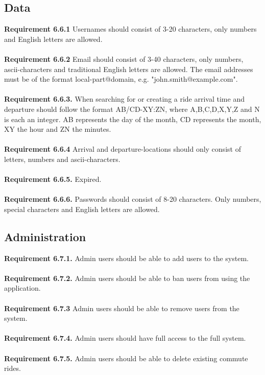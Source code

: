 \documentclass{article}
\begin{document}
\subsection{Data} \label{section:data}
\textbf{Requirement 6.6.1} Usernames should consist of 3-20 characters, only numbers and English letters are allowed. 
\mbox{}\\
\\
\textbf{Requirement 6.6.2} Email should consist of 3-40 characters, only numbers, ascii-characters and traditional English letters are allowed. The email addresses must be of the format local-part@domain, e.g. "john.smith@example.com".
\mbox{}\\
\\
\textbf{Requirement 6.6.3.} When searching for or creating a ride  arrival time and departure should follow the format AB/CD-XY:ZN, where A,B,C,D,X,Y,Z and N is each an integer. AB represents the day of the month, CD represents the month, XY the hour and ZN the minutes. 
\\ \\
\textbf{Requirement 6.6.4} Arrival and departure-locations should only consist of letters, numbers and ascii-characters.
\\ \\
\textbf{Requirement 6.6.5.} Expired.
\\ \\ 
\textbf{Requirement 6.6.6.} Passwords should consist of 8-20 characters. Only numbers, special characters and English letters are allowed.


\subsection{Administration}
\textbf{Requirement 6.7.1.} Admin users should be able to add users to the system.
\\ \\
\textbf{Requirement 6.7.2.} Admin users should be able to ban users from using the application.
\\ \\
\textbf{Requirement 6.7.3} Admin users should be able to remove users from the system.
\\ \\
\textbf{Requirement 6.7.4.} Admin users should have full access to the full system.
\\ \\
\textbf{Requirement 6.7.5.} Admin users should be able to delete existing commute rides.
\end{document}
